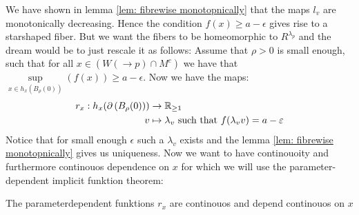 	We have shown in lemma \ref{lem: fibrewise monotopnically} that the maps $l_v$ are monotonically decreasing. Hence the condition $f(x)\geq a-\epsilon$ gives rise to a starshaped fiber. But we want the fibers to be homeomorphic to $R^{\lambda_p}$ and the dream would be to just rescale it as follows: 
	Assume that $\rho>0$ is small enough, such that for all $x\in \left( W(\to p)\cap M^{c}\right) $ we have that $\sup\limits_{x\in h_x\left(B_{\rho}(0)\right)}(f(x))\geq a-\epsilon$. Now we have the maps: 
	\begin{align*}
		r_x: h_x(\partial\left(B_{\rho}(0)\right))&\to \mathbb{R}_{\geq 1}\\
		v&\mapsto \lambda_v \text{ such that }f( \lambda_v v)=a-\varepsilon
	\end{align*} Notice that for small enough $\epsilon$ such a $\lambda_v$ exists and the lemma \ref{lem: fibrewise monotopnically} gives us uniqueness. Now we want to have continouoity and furthermore continouos dependence on $x$ for which we will use the parameter-dependent implicit funktion theorem:
\begin{lemma}
	The parameterdependent funktions $r_x$ are continouos and depend continouos on $x$
\end{lemma}
